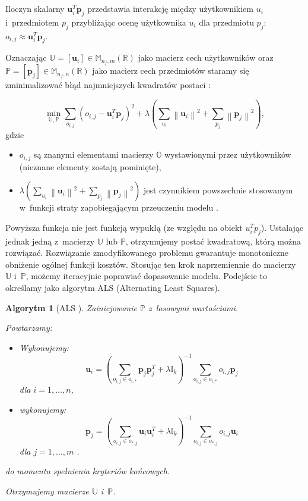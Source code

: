 \documentclass[12pt,a4paper]{report}
\newtheorem{algorytm}[df]{Algorytm}
\newcommand{\setR}{\mathbb{R}}
\newcommand{\norm}[2][]{\left\| {#2} \right\|_{#1}}
\begin{document}
Iloczyn skalarny $\mathbf{u}_i^T \mathbf{p}_j$ przedstawia interakcję między użytkownikiem $u_i$ i~przedmiotem $p_j$ przybliżając ocenę użytkownika $u_i$ dla przedmiotu $p_j$: $o_{i,j} \approx \mathbf{u}_i^T \mathbf{p}_j$. 

Oznaczając $\mathbb{U}=[\mathbf{u}_i] \in \mathbb{M}_{n_f,m}(\setR)$ jako macierz cech użytkowników oraz $\mathbb{P}=[\mathbf{p}_j] \in \mathbb{M}_{n_f,n}(\setR)$ jako macierz cech przedmiotów staramy się zminimalizować błąd najmniejszych kwadratów postaci {\citep{mcvals}}:

$$
\min_{\mathbb{U}, \mathbb{P}} \sum_{o_{i,j}} (o_{i,j} - \mathbf{u}_i^T \mathbf{p}_j)^2 + \lambda (\sum_{u_i} \norm{\mathbf{u}_i}^2 + \sum_{p_j} \norm{\mathbf{p}_j}^2),
$$
gdzie 
\begin{itemize}
\item $o_{i,j}$ są znanymi elementami macierzy $\mathbb{O}$ wystawionymi przez użytkowników (nieznane elementy zostają pominięte),
\item $\lambda (\sum_{u_i} \norm{\mathbf{u}_i}^2 + \sum_{p_j} \norm{\mathbf{p}_j}^2)$ jest czynnikiem powszechnie stosowanym w~funkcji straty zapobiegającym przeuczeniu modelu .
\end{itemize}

Powyższa funkcja nie jest funkcją wypukłą (ze względu na obiekt $u_i^Tp_j$). Ustalając jednak jedną z~macierzy $\mathbb{U}$ lub $\mathbb{P}$, otrzymujemy postać kwadratową, którą można rozwiązać. Rozwiązanie zmodyfikowanego problemu gwarantuje monotoniczne obniżenie ogólnej funkcji kosztów. Stosując ten krok naprzemiennie do macierzy $\mathbb{U}$ i~$\mathbb{P}$, możemy iteracyjnie poprawiać dopasowanie modelu. Podejście to określamy jako algorytm ALS (Alternating Least Squares).

\begin{algorytm}[ALS {\citep{mcvals}}]
Zainicjowanie $\mathbb{P}$ z~losowymi wartościami.

Powtarzamy:
\begin{itemize}
\item Wykonujemy:
$$
\mathbf{u}_i = (\sum_{o_{i,j} \in o_{i,*}} \mathbf{p}_j \mathbf{p}_j^T + \lambda \mathbb{I}_k)^{-1} \sum_{o_{i,j} \in o_{i,*}} o_{i,j}\mathbf{p}_j
$$
dla $i = 1, \ldots, n $,
\item wykonujemy:
$$
\mathbf{p}_j = (\sum_{o_{i,j} \in o_{*,j}} \mathbf{u}_i \mathbf{u}_i^T + \lambda \mathbb{I}_k)^{-1} \sum_{o_{i,j} \in o_{*,j}} o_{i,j}\mathbf{u}_i
$$
dla $j = 1, \ldots, m$ .
\end{itemize}
do momentu spełnienia kryteriów końcowych.

Otrzymujemy macierze $\mathbb{U}$ i~$\mathbb{P}$.
\end{algorytm}
\end{document}

